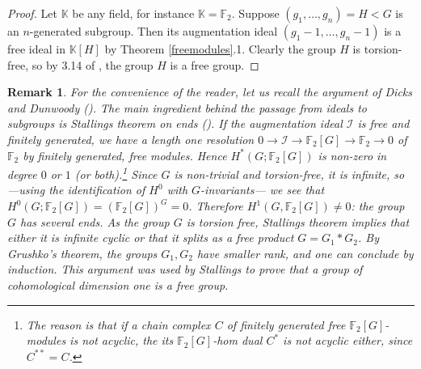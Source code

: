 \documentclass[11pt,letterpaper]{amsart}
\newtheorem*{remark}{Remark}
\begin{document}
\begin{proof}
Let $\mathbb{K}$ be any field, for instance $\mathbb{K}=\mathbb{F}_2$. Suppose $(g_1, \ldots, g_n) = H<G$ is an $n$-generated subgroup. Then its augmentation ideal $(g_1 - 1, \ldots, g_n - 1)$ is a free ideal in $\mathbb{K} [H]$ by Theorem \ref{freemodules}.1. Clearly the group $H$ is torsion-free, so by 3.14 of \cite{dicksdunwoody}, the group $H$ is a free group.
\end{proof}

\begin{remark}
For the convenience of the reader, let us recall the argument of Dicks and Dunwoody (\cite{dicksdunwoody}). The main ingredient behind the passage from ideals to subgroups is Stallings theorem on ends (\cite{stallings}). If the augmentation ideal $\mathcal{I}$ is free and finitely generated, we have a length one resolution $0\rightarrow \mathcal{I} \rightarrow \mathbb{F}_2 [G] \rightarrow\mathbb{F}_2 \rightarrow 0$ of $\mathbb F_2$ by finitely generated, free modules. Hence $H^*(G;\mathbb F_2[G])$ is non-zero in degree $0$ or $1$ (or both).\footnote{The reason is that if a chain complex $C$ of finitely generated free $\mathbb F_2[G]$-modules is not acyclic, the its $\mathbb F_2[G]$-hom dual $C^*$ is not acyclic either, since $C^{**}=C$.} Since $G$ is non-trivial and torsion-free, it is infinite, so---using the identification of $H^0$ with $G$-invariants--- we see that $H^0(G;\mathbb F_2[G])=(\mathbb F_2[G])^G=0$. Therefore $H^1 (G, \mathbb{F}_2 [G]) \neq 0$: the group $G$ has several ends. As the group $G$ is torsion free, Stallings theorem implies that either it is infinite cyclic or that it splits as a free product $G = G_1 \ast G_2$. By Grushko's theorem, the groups $G_1, G_2$ have smaller rank, and one can conclude by induction. This argument was used by Stallings to prove that a group of cohomological dimension one is a free group.
\end{remark}
\end{document}
